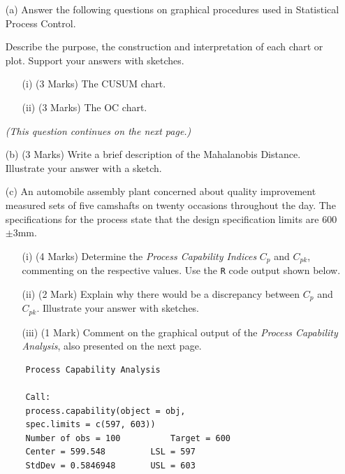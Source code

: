 \documentclass[a4paper,12pt]{article}
\begin{document}
\begin{itemize}
	\item[(a)] Answer the following questions on graphical procedures used in Statistical Process Control.\\ \smallskip
	
	\noindent Describe the purpose, the construction and interpretation of each chart or plot. Support your answers with sketches. 
	
	\begin{itemize}

		\item[(i)] (3 Marks) The CUSUM chart.
		\item[(ii)] (3 Marks) The OC chart. 
	\end{itemize}

\textit{(This question continues on the next page.)}		
\newpage	

	\item[(b)] (3 Marks) Write a brief description of the Mahalanobis Distance. Illustrate your answer with a sketch.
	


\item[(c)]
An automobile assembly plant concerned about quality improvement measured sets of five camshafts on twenty occasions throughout the day. The specifications for the process state that the design specification limits are 600$\pm$3mm.


\begin{itemize}
	\item[(i)] (4 Marks) Determine the \emph{Process Capability Indices} $C_p$ and $C_{pk}$, commenting on the respective values. Use the \texttt{R} code output shown below.
	\item[(ii)] (2 Mark)  Explain why there would be a discrepancy between $C_p$ and $C_{pk}$. Illustrate your answer with sketches.
	\item[(iii)] (1 Mark) Comment on the graphical output of the \emph{Process Capability Analysis}, also presented on the next page.
\end{itemize}


\begin{framed}
	\begin{verbatim}
	Process Capability Analysis
	
	Call:
	process.capability(object = obj,  
	spec.limits = c(597, 603))
	Number of obs = 100          Target = 600
	Center = 599.548         LSL = 597
	StdDev = 0.5846948       USL = 603
	

\end{verbatim}
\end{framed}
\end{itemize}
\end{document}
